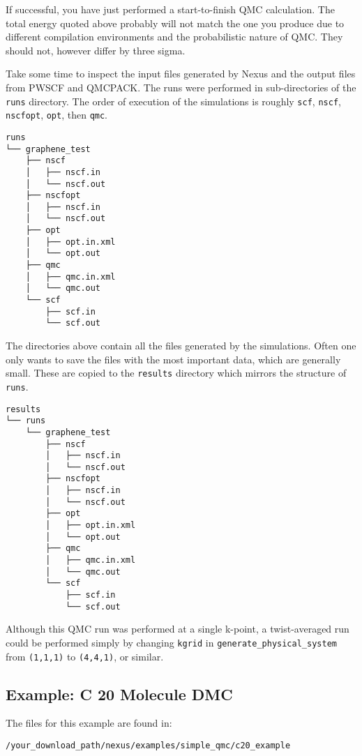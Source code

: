 \documentclass[oneside,11pt]{memoir}
\numberwithin{equation}{section}
\begin{document}
If successful, you have just performed a start-to-finish QMC calculation.  
The total energy quoted above probably will not match the one you produce 
due to different compilation environments and the probabilistic nature of 
QMC.  They should not, however differ by three sigma.

Take some time to inspect the input files generated by Nexus and 
the output files from PWSCF and QMCPACK.  The runs were performed in 
sub-directories of the \texttt{runs} directory.  The order of execution of 
the simulations is roughly \texttt{scf}, \texttt{nscf}, \texttt{nscfopt}, 
\texttt{opt}, then \texttt{qmc}.

\begin{shaded}
\begin{verbatim}
runs
└── graphene_test
    ├── nscf
    │   ├── nscf.in
    │   └── nscf.out
    ├── nscfopt
    │   ├── nscf.in
    │   └── nscf.out
    ├── opt
    │   ├── opt.in.xml
    │   └── opt.out
    ├── qmc
    │   ├── qmc.in.xml
    │   └── qmc.out
    └── scf
        ├── scf.in
        └── scf.out
\end{verbatim}
\end{shaded}

The directories above contain all the files generated by the simulations.  
Often one only wants to save the files with the most important data, which 
are generally small.  These are copied to the \texttt{results} directory 
which mirrors the structure of \texttt{runs}. 

\begin{shaded}
\begin{verbatim}
results
└── runs
    └── graphene_test
        ├── nscf
        │   ├── nscf.in
        │   └── nscf.out
        ├── nscfopt
        │   ├── nscf.in
        │   └── nscf.out
        ├── opt
        │   ├── opt.in.xml
        │   └── opt.out
        ├── qmc
        │   ├── qmc.in.xml
        │   └── qmc.out
        └── scf
            ├── scf.in
            └── scf.out
\end{verbatim}
\end{shaded}

Although this QMC run was performed at a single k-point, a twist-averaged run 
could be performed simply by changing \texttt{kgrid} in 
\texttt{generate\_physical\_system} from \texttt{(1,1,1)} to \texttt{(4,4,1)}, 
or similar.
 

\pagebreak
\subsection{Example: C 20 Molecule DMC}  \label{c20_dmc}
The files for this example are found in:
\begin{shaded}
\begin{verbatim}
/your_download_path/nexus/examples/simple_qmc/c20_example
\end{verbatim}
\end{shaded}
\end{document}

